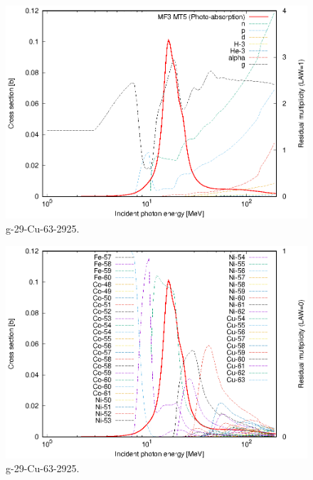 \begin{figure}
 \includegraphics[width=\linewidth]{eps/g_29-Cu-63_2925.eps}
  \caption{g-29-Cu-63-2925.}
\end{figure}
\begin{figure}
 \includegraphics[width=\linewidth]{eps-law0/g_29-Cu-63_2925.eps}
 \caption{g-29-Cu-63-2925.}
\end{figure}
\newpage \clearpage

